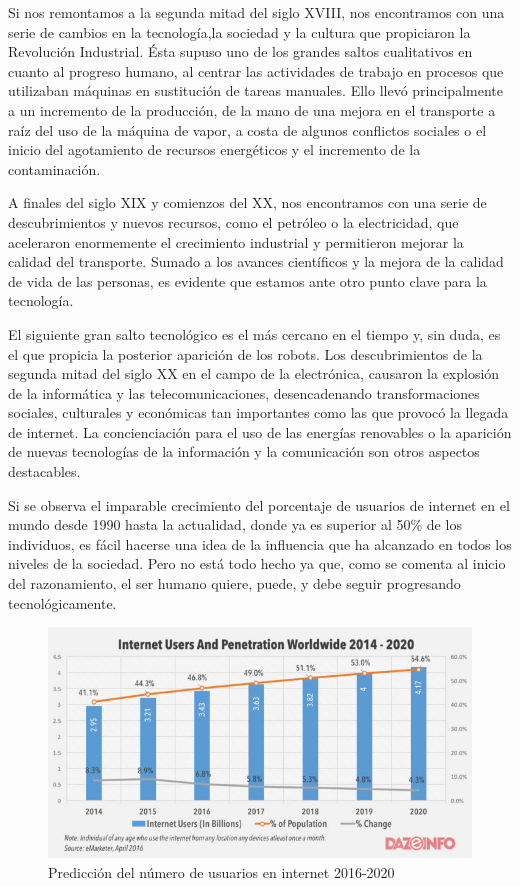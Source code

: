 \documentclass[12pt,spanish,chapterprefix, numbers=noenddot]{book}
\numberwithin{equation}{section}
\numberwithin{figure}{section}
\begin{document}
Si nos remontamos a la segunda mitad del siglo XVIII,  nos encontramos con una serie de cambios en la tecnología,la sociedad y la cultura que propiciaron la Revolución Industrial. Ésta supuso uno de los grandes saltos cualitativos en cuanto al progreso humano, al centrar las actividades de trabajo en procesos que utilizaban máquinas en sustitución de tareas manuales. Ello llevó principalmente a un incremento de la producción, de la mano de una mejora en el transporte a raíz del uso de la máquina de vapor, a costa de algunos conflictos sociales o el inicio del agotamiento de recursos energéticos y el incremento de la contaminación. 

A finales del siglo XIX y comienzos del XX, nos encontramos con una serie de descubrimientos y nuevos recursos, como el petróleo o la electricidad, que aceleraron enormemente el crecimiento industrial y permitieron mejorar la calidad del transporte. Sumado a los avances científicos y la mejora de la calidad de vida de las personas, es evidente que estamos ante otro punto clave para la tecnología. 

El siguiente gran salto tecnológico es el más cercano en el tiempo y, sin duda, es el que propicia la posterior aparición de los robots. Los descubrimientos de la segunda mitad del siglo XX en el campo de la electrónica, causaron la explosión de la informática y las telecomunicaciones, desencadenando transformaciones sociales, culturales y económicas tan importantes como las que provocó la llegada de internet. La concienciación para el uso de las energías renovables o la aparición de nuevas tecnologías de la información y la comunicación son otros aspectos destacables. 

Si se observa el imparable crecimiento del porcentaje de usuarios de internet en el mundo desde 1990 hasta la actualidad, donde ya es superior al 50\% de los individuos, es fácil hacerse una idea de la influencia que ha alcanzado en todos los niveles de la sociedad. Pero no está todo hecho ya que, como se comenta al inicio del razonamiento, el ser humano quiere, puede, y debe seguir progresando tecnológicamente.  

\begin{figure}[hbt!]
\centering
\includegraphics[width=12cm]{Figs/internetWorldwide.jpg}
\par
\caption{\label{fig:internetWorldwide}Predicción del número de usuarios en internet 2016-2020}
\end{figure}
\end{document}
